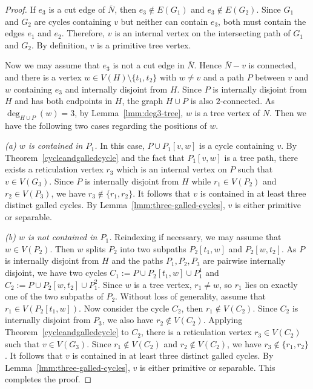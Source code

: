 \documentclass[pdflatex,sn-mathphys-num]{sn-jnl}
\theoremstyle{thmstyleone}%
\theoremstyle{thmstyletwo}%
\theoremstyle{thmstylethree}%
\begin{document}
\begin{proof}
If $e_3$ is a cut edge of $\overline{N}$, then $e_3 \notin E(G_1)$ and $e_3 \notin E(G_2)$. Since $G_1$ and $G_2$ are cycles containing $v$ but neither can contain $e_3$, both must contain the edges $e_1$ and $e_2$. Therefore, $v$ is an internal vertex on the intersecting path of $G_1$ and $G_2$. By definition, $v$ is a primitive tree vertex.


Now we may assume that $e_3$ is not a cut edge in $\overline{N}$. Hence $\overline{N}-v$ is connected, and there is a vertex $w\in V(H)\setminus\{t_1,t_2\}$ with $w\ne v$ and a path $P$ between $v$ and   $w$ containing $e_3$ and internally disjoint from $H$. Since $P$ is internally disjoint from $H$ and has both endpoints in $H$, the graph $H\cup P$ is also $2$-connected. As $\deg_{H \cup P}(w) = 3$, by Lemma~\ref{lmm:deg3-tree}, $w$ is a tree vertex of $N$. Then we have the following two cases regarding the positions of $w$.

\smallskip
\noindent\emph{(a) $w$ is contained in $P_1$.}
In this case, $P\cup P_1[v,w]$ is a cycle containing $v$.
By Theorem~\ref{cycleandgalledcycle} and the fact that $P_1[v,w]$ is a tree path, there exists a reticulation vertex $r_3$ which is an internal vertex on $P$ such that $v \in V(G_3)$. Since $P$ is internally disjoint from $H$ while $r_1 \in V(P_2)$ and $r_2 \in V(P_3)$, we have $r_3 \notin \{r_1, r_2\}$. It follows that $v$ is contained in at least three distinct galled cycles. By Lemma~\ref{lmm:three-galled-cycles}, $v$ is either primitive or separable.

\smallskip
\noindent\emph{(b) $w$ is not contained in $P_1$.} Reindexing if necessary, we may assume that $w\in V(P_2)$. 
Then $w$ splits $P_2$ into two subpaths $P_2[t_1,w]$ and $P_2[w,t_2]$.
As $P$ is internally disjoint from $H$ and the paths $P_1,P_2,P_3$ are pairwise internally disjoint, we have two cycles $C_1:=P\cup P_2[t_1,w]\cup P_1^1$ and $C_2:=P\cup P_2[w,t_2]\cup P_1^2$. Since $w$ is a tree vertex, $r_1\ne w$, so $r_1$ lies on exactly one of the two subpaths of $P_2$. Without loss of generality, assume that $r_1\in V(P_2[t_1,w])$. Now consider the cycle $C_2$, then $r_1\notin V(C_2)$. Since $C_2$ is internally disjoint from $P_3$, we also have $r_2\notin V(C_2)$. Applying Theorem~\ref{cycleandgalledcycle} to $C_2$, there is a reticulation vertex $r_3\in V(C_2)$ such that $v\in V(G_3)$. Since $r_1 \notin V(C_2)$ and $r_2 \notin V(C_2)$, we have $r_3 \notin \{r_1, r_2\}$. It follows that $v$ is contained in at least three distinct galled cycles. By Lemma~\ref{lmm:three-galled-cycles}, $v$ is either primitive or separable. This completes the proof.
\end{proof}
\end{document}
